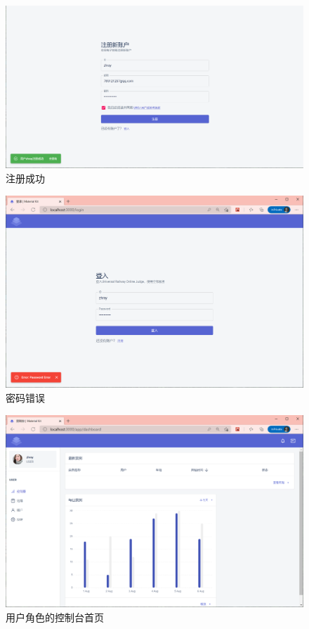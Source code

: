 \begin{figure}[htbp!]
    \centering
    \includegraphics[width=\textwidth]{figures/png/reg_succ.png}
    \caption{\label{reg_succ}注册成功}
\end{figure}

\begin{figure}[htbp!]
    \centering
    \includegraphics[width=\textwidth]{figures/png/pwd_err.png}
    \caption{\label{pwd_err}密码错误}
\end{figure}

\begin{figure}[htbp!]
    \centering
    \includegraphics[width=\textwidth]{figures/png/user_ui.png}
    \caption{\label{user_ui}用户角色的控制台首页}
\end{figure}

